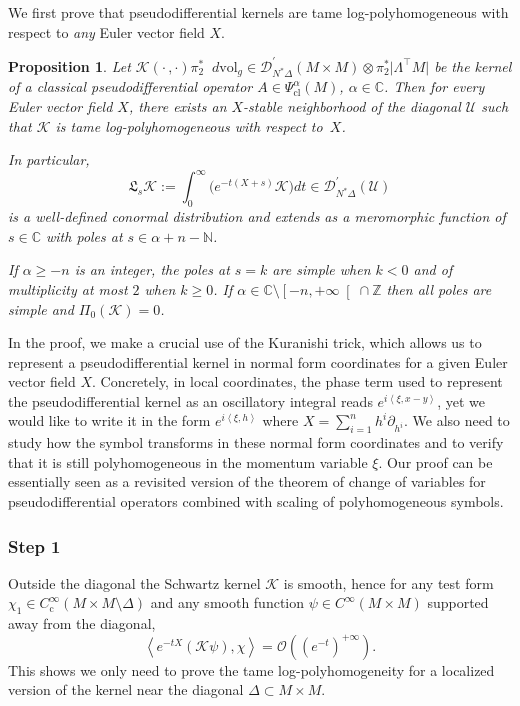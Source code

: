 \documentclass[10pt]{amsart}
\let\pazocal\mathscr
\newcommand{\LtM}{\Lambda^{\!\!\top\!}M}
\newtheorem{proposition}[theorem]{Proposition}
\theoremstyle{definition}
\renewcommand\c{\mathrm{c}}
\newcommand{\ph}{\mathrm{cl}}
\let\cv\alpha
\let\euler X
\newcommand{\clopen}[1]{\mathopen{}\mathclose{\left[#1 \right[}}
\newcommand{\step}[1]{\subsubsection*{Step #1}}
\newcommand\dvol{\mathop{}\!d\mathrm{vol}}
\begin{document}
We first prove that pseudodifferential kernels
are tame log-polyhomogeneous with respect to \emph{any} Euler vector field $\euler$.
\begin{proposition}\label{p:pseudopoly}
Let $\pazocal{K}(\cdot\,,\cdot)\pi_2^*\dvol_g\in \pazocal{D}^\prime_{N^*\Delta}(M\times M)\otimes \pi_2^*\vert \LtM \vert$ be the kernel of a classical pseudodifferential operator $A\in \Psi^\cv_{\ph}(M)$, {$\cv\in \mathbb{C}$}.
Then for every Euler vector field $\euler$, there exists an $\euler$-stable neighborhood of the diagonal $\pazocal{U}$ such that $\pazocal{K}$ is tame log-polyhomogeneous with respect to~$\euler$.

In particular,
\[
\mathfrak{L}_s\pazocal{K} {:= \int_0^\infty \bigl(e^{-t(\euler+s)}\pazocal{K}\bigr) dt \in \pazocal{D}^\prime_{N^*\Delta}(\pazocal{U})}
\]
is a well-defined conormal distribution and extends as a {meromorphic function} of $s\in \mathbb{C}$
with poles at $s\in \cv+n-\mathbb{N}$.

If $\cv\geqslant -n$ is an integer,
the poles at $s=k$ are simple when $k<0$ and of multiplicity at most $2$ when
$k\geqslant 0$. If $\cv\in \mathbb{C}\setminus \clopen{-n,+\infty}\cap \mathbb{Z} $ then all poles are simple and $\Pi_0(\pazocal{K})=0$.
\end{proposition}
In the proof, we make a crucial use of the Kuranishi trick, which allows us to represent a pseudodifferential kernel in normal form coordinates for a given Euler vector field $X$.
Concretely, in local coordinates, the phase term used to represent the pseudodifferential kernel as an oscillatory integral reads $e^{i\left\langle\xi,x-y \right\rangle}$, yet we would like to write it in the form $e^{i\left\langle\xi,h\right\rangle}$ where $X=\sum_{i=1}^nh^i\partial_{h^i}$. We also need to study how the symbol transforms in these normal form coordinates and to verify that it is still polyhomogeneous in the momentum variable $\xi$.
Our proof can be essentially seen as a revisited version of the theorem of change of variables for pseudodifferential operators combined with scaling of polyhomogeneous symbols.

\step{1} Outside the diagonal the
Schwartz kernel $\pazocal{K}$ is smooth, hence for any test form $\chi_1\in C^\infty_\c(M\times M\setminus \Delta)$ and any smooth function
$\psi\in C^\infty(M\times M)$ supported away from the diagonal,
\[
\left\langle e^{-t\euler} (\pazocal{K} \psi) ,\chi\right\rangle=\pazocal{O}((e^{-t})^{+\infty}).
\]
This shows we only need to prove the tame log-polyhomogeneity for a localized version of the kernel near the diagonal $\Delta\subset M\times M$.
\end{document}
